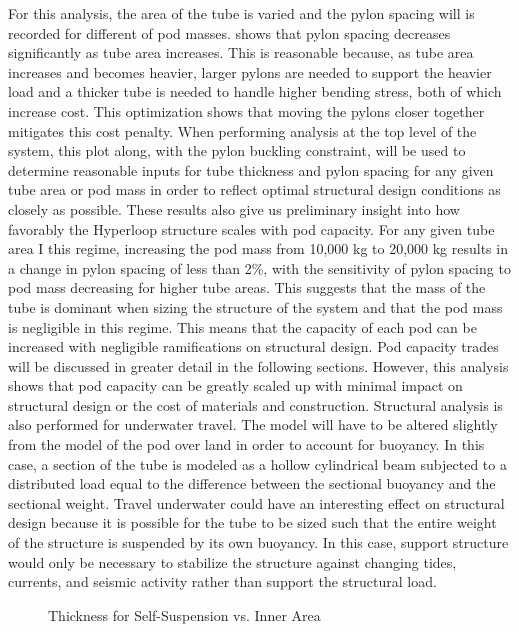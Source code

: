 For this analysis, the area of the tube is varied and the pylon spacing will is recorded for different of pod masses.  shows that pylon spacing decreases significantly as tube area increases. This is reasonable because, as tube area increases and becomes heavier, larger pylons are needed to support the heavier load and a thicker tube is needed to handle higher bending stress, both of which increase cost. This optimization shows that moving the pylons closer together mitigates this cost penalty. When performing analysis at the top level of the system, this plot along, with the pylon buckling constraint, will be used to determine reasonable inputs for tube thickness and pylon spacing for any given tube area or pod mass in order to reflect optimal structural design conditions as closely as possible.
These results also give us preliminary insight into how favorably the Hyperloop structure scales with pod capacity. For any given tube area I this regime, increasing the pod mass from 10,000 kg to 20,000 kg results in a change in pylon spacing of less than 2\%, with the sensitivity of pylon spacing to pod mass decreasing for higher tube areas. This suggests that the mass of the tube is dominant when sizing the structure of the system and that the pod mass is negligible in this regime. This means that the capacity of each pod can be increased with negligible ramifications on structural design. Pod capacity trades will be discussed in greater detail in the following sections. However, this analysis shows that pod capacity can be greatly scaled up with minimal impact on structural design or the cost of materials and construction.
Structural analysis is also performed for underwater travel. The model will have to be altered slightly from the model of the pod over land in order to account for buoyancy. In this case, a section of the tube is modeled as a hollow cylindrical beam subjected to a distributed load equal to the difference between the sectional buoyancy and the sectional weight. Travel underwater could have an interesting effect on structural design because it is possible for the tube to be sized such that the entire weight of the structure is suspended by its own buoyancy. In this case, support structure would only be necessary to stabilize the structure against changing tides, currents, and seismic activity rather than support the structural load.

\begin{figure}
	\centering
	\caption{Thickness for Self-Suspension vs. Inner Area}
	\label{fig:thick_susp_vs_area}
\end{figure}

